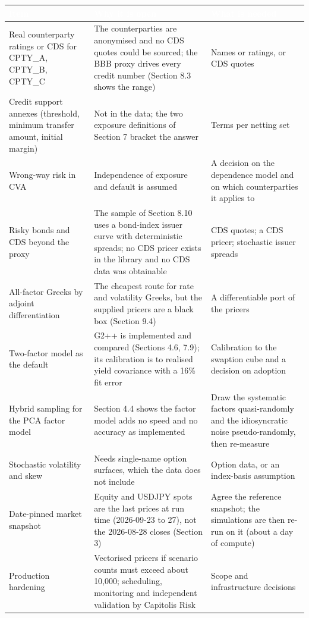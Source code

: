 \documentclass[11pt,letterpaper]{article}
\begin{document}
{\scriptsize\setlength{\LTpre}{4pt}\setlength{\LTpost}{6pt}
\begin{longtable}{>{\raggedright\arraybackslash}p{}>{\raggedright\arraybackslash}p{}>{\raggedright\arraybackslash}p{}}
\toprule
\rowcolor{navy}\textbf{\textcolor{white}{Item}} & \textbf{\textcolor{white}{Why it is open}} & \textbf{\textcolor{white}{What is needed}} \\
\endhead
Real counterparty ratings or CDS for CPTY\_A, CPTY\_B, CPTY\_C & The counterparties are anonymised and no CDS quotes could be sourced; the BBB proxy drives every credit number (Section 8.3 shows the range) & Names or ratings, or CDS quotes \\
\rowcolor{gray!9}Credit support annexes (threshold, minimum transfer amount, initial margin) & Not in the data; the two exposure definitions of Section 7 bracket the answer & Terms per netting set \\
Wrong-way risk in CVA & Independence of exposure and default is assumed & A decision on the dependence model and on which counterparties it applies to \\
\rowcolor{gray!9}Risky bonds and CDS beyond the proxy & The sample of Section 8.10 uses a bond-index issuer curve with deterministic spreads; no CDS pricer exists in the library and no CDS data was obtainable & CDS quotes; a CDS pricer; stochastic issuer spreads \\
All-factor Greeks by adjoint differentiation & The cheapest route for rate and volatility Greeks, but the supplied pricers are a black box (Section 9.4) & A differentiable port of the pricers \\
\rowcolor{gray!9}Two-factor model as the default & G2++ is implemented and compared (Sections 4.6, 7.9); its calibration is to realised yield covariance with a 16\% fit error & Calibration to the swaption cube and a decision on adoption \\
Hybrid sampling for the PCA factor model & Section 4.4 shows the factor model adds no speed and no accuracy as implemented & Draw the systematic factors quasi-randomly and the idiosyncratic noise pseudo-randomly, then re-measure \\
\rowcolor{gray!9}Stochastic volatility and skew & Needs single-name option surfaces, which the data does not include & Option data, or an index-basis assumption \\
Date-pinned market snapshot & Equity and USDJPY spots are the last prices at run time (2026-09-23 to 27), not the 2026-08-28 closes (Section 3) & Agree the reference snapshot; the simulations are then re-run on it (about a day of compute) \\
\rowcolor{gray!9}Production hardening & Vectorised pricers if scenario counts must exceed about 10,000; scheduling, monitoring and independent validation by Capitolis Risk & Scope and infrastructure decisions \\
\bottomrule
\end{longtable}}
\end{document}
